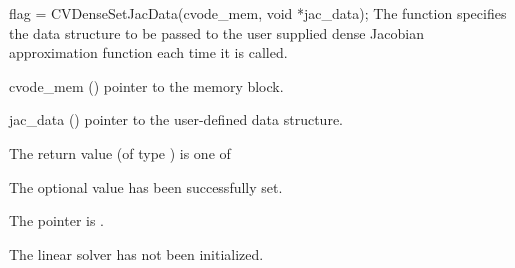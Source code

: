 {
  flag = CVDenseSetJacData(cvode\_mem, void *jac\_data);
}
{
  The function  specifies the data structure
  to be passed to the user supplied dense Jacobian approximation 
  function each time it is called.
}
{
  \begin{args}
  \item[cvode\_mem] ()
    pointer to the {\cvode} memory block.
  \item[jac\_data] ()
    pointer to the user-defined data structure.
  \end{args}
}
{
  The return value  (of type ) is one of
  \begin{args}
  \item[\Id{SUCCESS}] 
    The optional value has been successfully set.
  \item[\Id{LIN\_NO\_MEM}]
    The  pointer is .
  \item[\Id{LIN\_NO\_LMEM}]
    The {\cvdense} linear solver has not been initialized.
  \end{args}
}
{}
